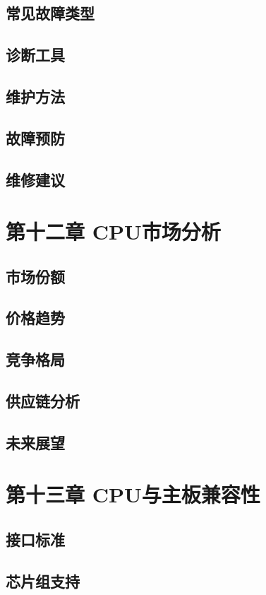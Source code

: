 \documentclass[12pt,UTF8]{ctexbook}
\begin{document}
\section{常见故障类型}
\section{诊断工具}
\section{维护方法}
\section{故障预防}
\section{维修建议}

\chapter{第十二章 CPU市场分析}

\section{市场份额}
\section{价格趋势}
\section{竞争格局}
\section{供应链分析}
\section{未来展望}

\chapter{第十三章 CPU与主板兼容性}

\section{接口标准}
\section{芯片组支持}
\end{document}
